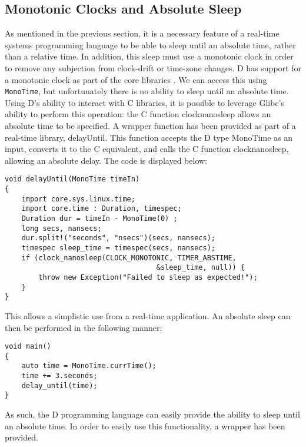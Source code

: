 \subsection{Monotonic Clocks and Absolute Sleep}
As mentioned in the previous section, it is a necessary feature of a real-time 
systems programming language to be able to sleep until an absolute time, rather 
than a relative time. In addition, this sleep must use a monotonic clock in order 
to remove any subjection from clock-drift or time-zone changes. D has support 
for a monotonic clock as part of the core libraries 
\cite{dlang-core-time}. We can access this using 
\texttt{MonoTime}, but unfortunately there is no ability to sleep until an 
absolute time. Using D's ability to interact with C libraries, it is possible 
to leverage Glibc's ability to perform this operation: the C function 
clock\textunderscore{}nanosleep allows an absolute time to be specified.
\cite{clock-nanosleep}
A wrapper function has been provided as part of a real-time library, delayUntil. 
This function accepts the D type MonoTime as an input, converts it to the C 
equivalent, and calls the C function clock\textunderscore{}nanosleep, allowing an absolute delay.
The code is displayed below: 
\begin{lstlisting}
void delayUntil(MonoTime timeIn)
{
    import core.sys.linux.time; 
    import core.time : Duration, timespec; 
    Duration dur = timeIn - MonoTime(0) ;
    long secs, nansecs; 
    dur.split!("seconds", "nsecs")(secs, nansecs); 
    timespec sleep_time = timespec(secs, nansecs); 
    if (clock_nanosleep(CLOCK_MONOTONIC, TIMER_ABSTIME, 
                                    &sleep_time, null)) {
        throw new Exception("Failed to sleep as expected!"); 
    }
}
\end{lstlisting}
This allows a simplistic use from a real-time application. An absolute sleep can 
then be performed in the following manner: 
\begin{lstlisting}
void main()
{
    auto time = MonoTime.currTime(); 
    time += 3.seconds; 
    delay_until(time);
}
\end{lstlisting}
As such, the D programming language can easily provide the ability to sleep 
until an absolute time. In order to easily use this functionality, a 
wrapper has been provided.


